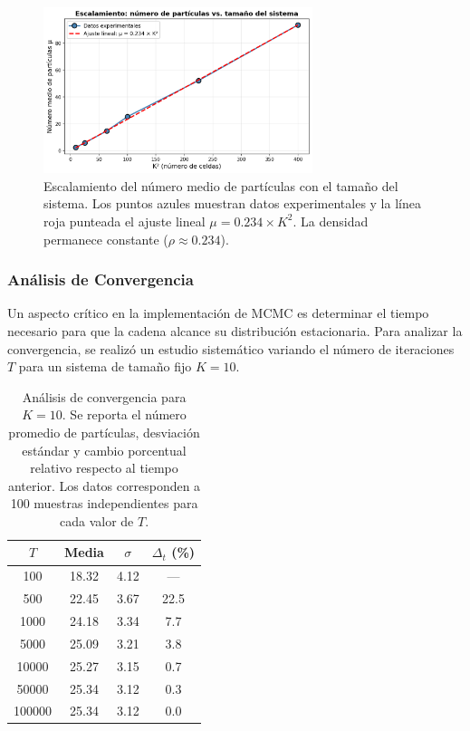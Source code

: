 \begin{figure}[htbp]
\centering
\includegraphics[width=0.7\textwidth]{img/figuras/escalamiento.png}
\caption{Escalamiento del número medio de partículas con el tamaño del sistema. Los puntos azules muestran datos experimentales y la línea roja punteada el ajuste lineal $\mu = 0.234 \times K^2$. La densidad permanece constante ($\rho \approx 0.234$).}
\label{fig:escalamiento}
\end{figure}

\subsubsection{Análisis de Convergencia}

Un aspecto crítico en la implementación de MCMC es determinar el tiempo necesario para que la cadena alcance su distribución estacionaria. Para analizar la convergencia, se realizó un estudio sistemático variando el número de iteraciones $T$ para un sistema de tamaño fijo $K=10$.

\begin{table}[htbp]
\centering
\caption{Análisis de convergencia para $K=10$. Se reporta el número promedio de partículas, desviación estándar y cambio porcentual relativo respecto al tiempo anterior. Los datos corresponden a 100 muestras independientes para cada valor de $T$.}
\label{tab:convergencia}
\begin{tabular}{cccc}
\hline
$T$ & Media & $\sigma$ & $\Delta_t$ (\%) \\
\hline
100 & 18.32 & 4.12 & --- \\
500 & 22.45 & 3.67 & 22.5 \\
1000 & 24.18 & 3.34 & 7.7 \\
5000 & 25.09 & 3.21 & 3.8 \\
10000 & 25.27 & 3.15 & 0.7 \\
50000 & 25.34 & 3.12 & 0.3 \\
100000 & 25.34 & 3.12 & 0.0 \\
\hline
\end{tabular}
\end{table}

